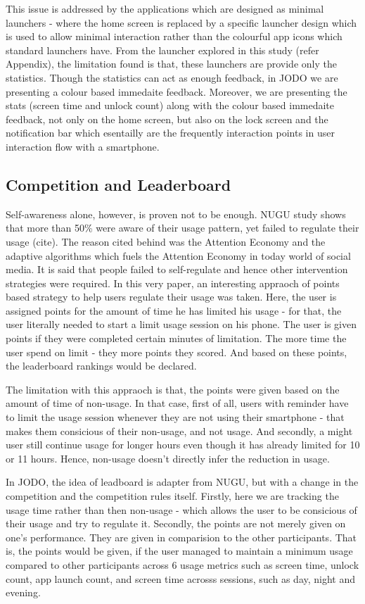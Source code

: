 \documentclass[11pt]{report}
\begin{document}
This issue is addressed by the applications which are designed as minimal launchers - where the home screen is replaced by a specific launcher design which is used to allow minimal interaction rather than the colourful app icons which standard launchers have.
From the launcher explored in this study (refer Appendix), the limitation found is that, these launchers are provide only the statistics. Though the statistics can act as enough feedback, in JODO we are presenting a colour based immedaite feedback. 
Moreover, we are presenting the stats (screen time and unlock count) along with the colour based immedaite feedback, not only on the home screen, but also on the lock screen and the notification bar which esentailly are the frequently interaction points in user interaction flow with a smartphone.

\subsection{Competition and Leaderboard}
Self-awareness alone, however, is proven not to be enough. 
NUGU study shows that more than 50\% were aware of their usage pattern, yet failed to regulate their usage (cite). 
The reason cited behind was the Attention Economy and the adaptive algorithms which fuels the Attention Economy in today world of social media. It is said that people failed to self-regulate and hence other intervention strategies were required. 
In this very paper, an interesting appraoch of points based strategy to help users regulate their usage was taken. 
Here, the user is assigned points for the amount of time he has limited his usage - for that, the user literally needed to start a limit usage session on his phone. The user is given points if they were completed certain minutes of limitation. 
The more time the user spend on limit - they more points they scored. And based on these points, the leaderboard rankings would be declared. 

The limitation with this appraoch is that, the points were given based on the amount of time of non-usage. 
In that case, first of all, users with reminder have to limit the usage session whenever they are not using their smartphone - that makes them consicious of their non-usage, and not usage.
And secondly, a might user still continue usage for longer hours even though it has already limited for 10 or 11 hours. Hence, non-usage doesn't directly infer the reduction in usage.

In JODO, the idea of leadboard is adapter from NUGU, but with a change in the competition and the competition rules itself. 
Firstly, here we are tracking the usage time rather than then non-usage - which allows the user to be consicious of their usage and try to regulate it.
Secondly, the points are not merely given on one's performance. They are given in comparision to the other participants. 
That is, the points would be given, if the user managed to maintain a minimum usage compared to other participants across 6 usage metrics such as screen time, unlock count, app launch count, and screen time acrosss sessions, such as day, night and evening.
\end{document}
